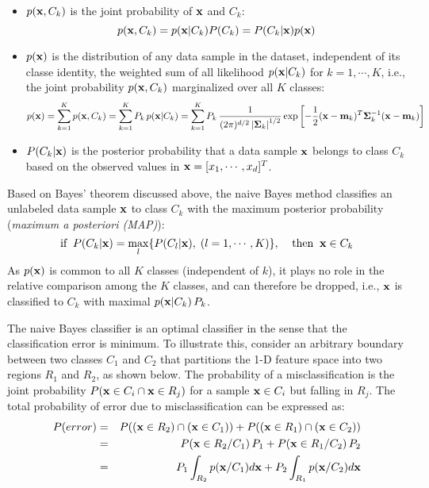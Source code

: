\documentclass{article}
\begin{document}
\begin{itemize}
\item $p({\bf x},C_k)$ is the joint probability of ${\bf x}$ and $C_k$:
  \begin{equation}
    p({\bf x},C_k)=p({\bf x}|C_k)P(C_k)=P(C_k|{\bf x})p({\bf x})
    \label{jointprobNB}
  \end{equation}

\item 
  $p({\bf x})$ is the distribution of any data sample in the dataset, 
  independent of its classe identity, the weighted sum of all 
  likelihood $p({\bf x}|C_k)$ for $k=1,\cdots,K$, i.e., the joint
  probability $p({\bf x},C_k)$ marginalized over all $K$ classes:
  \begin{equation} 
    p({\bf x})=\sum_{k=1}^K p({\bf x},C_k)=\sum_{k=1}^K P_k \,p({\bf x}|C_k)
    =\sum_{k=1}^K P_k \,
    \frac{1}{(2\pi)^{d/2} \left| {\bf \Sigma}_k\right|^{1/2}}
    \exp\left[-\frac{1}{2}({\bf x}-{\bf m}_k)^T{\bf \Sigma}_k^{-1}
      ({\bf x}-{\bf m}_k)\right]
    \label{pofxNB}
  \end{equation}

\item 
  $P(C_k|{\bf x})$ is the posterior probability that a data sample 
  ${\bf x}$ belongs to class $C_k$ based on the observed values in 
  ${\bf x}=[x_1,\cdots,x_d]^T$.
\end{itemize}

Based on Bayes' theorem discussed above, the naive Bayes method 
classifies an unlabeled data sample ${\bf x}$ to class $C_k$ with 
the maximum posterior probability ({\em maximum a posteriori (MAP)}):
\begin{equation}
  \mbox{if}\;\;P(C_k|{\bf x})=\max_l\{ P(C_l|{\bf x}),\;(l=1,\cdots,K)\},
  \;\;\;\;\mbox{then}\;\;{\bf x}\in C_k
  \label{BayesClassifier}
\end{equation}
As $p({\bf x})$ is common to all $K$ classes (independent of 
$k$), it plays no role in the relative comparison among the $K$ 
classes, and can therefore be dropped, i.e., ${\bf x}$ is classified
to $C_k$ with maximal $p({\bf x}|C_k)\,P_k$.

The naive Bayes classifier is an optimal classifier in the sense 
that the classification error is minimum. To illustrate this,
consider an arbitrary boundary between two classes $C_1$ and $C_2$ 
that partitions the 1-D feature space into two regions $R_1$ and
$R_2$, as shown below. The probability of a misclassification is
the joint probability $P( {\bf x}\in C_i \cap {\bf x}\in R_j)$
for a sample ${\bf x}\in C_i$ but falling in $R_j$. The total 
probability of error due to misclassification can be expressed as:
\begin{eqnarray}
  P(error) & = & P(({\bf x}\in R_2) \cap ({\bf x}\in C_1)) 
  +P(({\bf x}\in R_1) \cap ({\bf x}\in C_2)) \nonumber \\
  & = & P({\bf x} \in R_2/C_1)\,P_1
  +P({\bf x} \in R_1/C_2)\,P_2 \nonumber \\
  &=& P_1 \int_{R_2}p({\bf x}/C_1)d{\bf x}
  +P_2\int_{R_1}p({\bf x}/C_2)d{\bf x}
\end{eqnarray}
\end{document}
